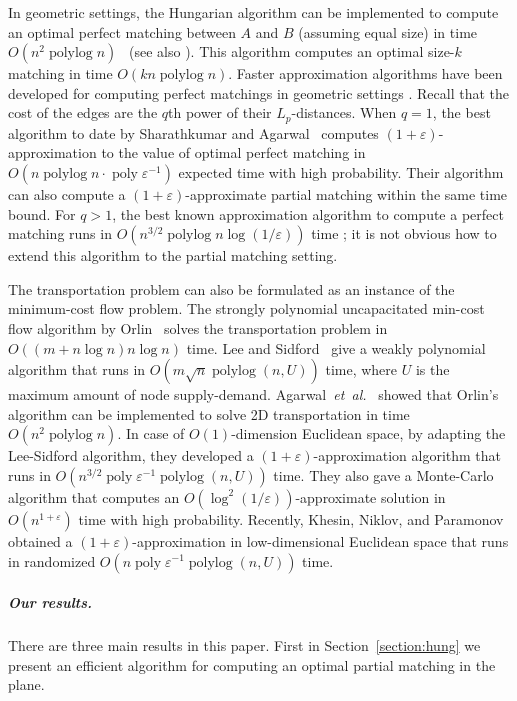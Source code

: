 \documentclass[a4paper,UKenglish]{socg-lipics-v2019}
\def\etal{\emph{et~al.}}
\def\etal{\textit{et~al.}}
\def\poly{\mathop{\mathrm{poly}}}
\def\polylog{\mathop{\mathrm{polylog}}}
\def\eps{\varepsilon}
\theoremstyle{plain}
\numberwithin{figure}{section}
\renewcommand{\paragraph}{\subparagraph}
\begin{document}
In geometric settings, the Hungarian algorithm can be implemented to compute
an optimal perfect matching between $A$ and $B$ (assuming equal size)
in time $O(n^2\polylog n)$~\cite{KMRSS17} (see also \cite{Vaidya89,AES99}).
This algorithm computes an optimal size-$k$ matching in time $O(kn\polylog n)$.
Faster approximation algorithms have been developed for computing perfect
matchings in geometric settings \cite{Vaidya89,V98,AV04,SA12}.
Recall that the cost of the edges are the $q$th power of their $L_p$-distances.
When $q = 1$, the best algorithm to date by Sharathkumar and Agarwal~\cite{SA12m}
computes $(1+\eps)$-approximation to the value of optimal perfect matching in
$O(n\polylog n \cdot \poly\eps^{-1})$ expected time with high probability.
Their algorithm can also compute a $(1+\eps)$-approximate partial
matching within the same time bound.
For $q > 1$, the best known approximation algorithm to compute a perfect
matching runs in $O(n^{3/2}\polylog n \log(1/\eps))$ time \cite{SA12};
it is not obvious how to extend this algorithm to the partial matching setting.

The transportation problem can also be formulated as an instance of the
minimum-cost flow problem.
The strongly polynomial uncapacitated min-cost flow algorithm by
Orlin~\cite{O93} solves the transportation problem in
$O((m + n\log n) n\log n)$ time.
Lee and Sidford~\cite{LS14} give a weakly polynomial algorithm that runs in
$O(m\sqrt{n}\polylog(n, U))$ time, where $U$ is the maximum amount of node supply-demand.
Agarwal~\etal~\cite{AFPVX17, AFPVX17arxiv} showed that Orlin's algorithm can be
implemented to solve 2D transportation in time $O(n^2\polylog n)$.
In case of $O(1)$-dimension Euclidean space,
by adapting the Lee-Sidford algorithm, they developed a
$(1+\eps)$-approximation algorithm that runs in $O(n^{3/2} \poly\eps^{-1} \polylog(n, U))$ time.
They also gave a Monte-Carlo algorithm that computes an
$O(\log^2(1/\eps))$-approximate solution in $O(n^{1+\eps})$ time with
high probability.
Recently, Khesin, Niklov, and Paramonov~\cite{KNP19} obtained a
$(1+\eps)$-approximation in low-dimensional Euclidean space
that runs in randomized $O(n \poly\eps^{-1} \polylog(n, U))$ time.

\paragraph{Our results.}
There are three main results in this paper.
First in Section~\ref{section:hung} we present an efficient algorithm for
computing an optimal partial matching in the plane.
\end{document}
